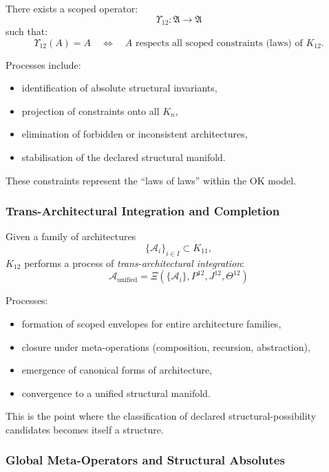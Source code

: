 There exists a scoped operator:
\[
\Upsilon_{12} : \mathfrak{A} \to \mathfrak{A}
\]
such that:
\[
\Upsilon_{12}(A) = A
\quad \Longleftrightarrow \quad
A \text{ respects all scoped constraints (laws) of } K_{12}.
\]

Processes include:
\begin{itemize}
    \item identification of absolute structural invariants,
    \item projection of constraints onto all $K_n$,
    \item elimination of forbidden or inconsistent architectures,
    \item stabilisation of the declared structural manifold.
\end{itemize}

These constraints represent the ``laws of laws'' within the OK model.

\subsubsection{Trans-Architectural Integration and Completion}

Given a family of architectures
\[
\{\mathcal{A}_i\}_{i \in I} \subset K_{11},
\]
$K_{12}$ performs a process of \emph{trans-architectural integration}:
\[
\mathcal{A}_{\text{unified}}
= \Xi(\{\mathcal{A}_i\}, P^{12}, J^{12}, \Theta^{12})
\]

Processes:
\begin{itemize}
    \item formation of scoped envelopes for entire architecture families,
    \item closure under meta-operations (composition, recursion, abstraction),
    \item emergence of canonical forms of architecture,
    \item convergence to a unified structural manifold.
\end{itemize}

This is the point where the classification of declared structural-possibility candidates becomes itself a structure.

\subsubsection{Global Meta-Operators and Structural Absolutes}

